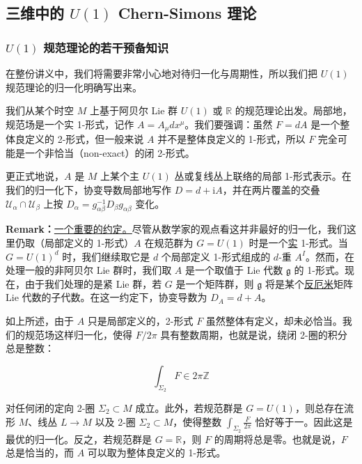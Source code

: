 \subsection{三维中的 $U(1)$ Chern-Simons 理论} %

\subsubsection{$U(1)$ 规范理论的若干预备知识} %

在整份讲义中，我们将需要非常小心地对待归一化与周期性，所以我们把 $U(1)$ 规范理论的归一化明确写出来。

我们从某个时空 $M$ 上基于阿贝尔 Lie 群 $U(1)$ 或 $\mathbb{R}$ 的规范理论出发。局部地，规范场是一个实 1-形式，记作 $A=A_\mu dx^\mu$。我们要强调：虽然 $F=dA$ 是一个整体良定义的 2-形式，但一般来说 $A$ 并不是整体良定义的 1-形式，所以 $F$ 完全可能是一个非恰当（non-exact）的闭 2-形式。

更正式地说，$A$ 是 $M$ 上某个主 $U(1)$ 丛或复线丛上联络的局部 1-形式表示。在我们的归一化下，协变导数局部地写作 $D=d+\mathrm{i}A$，并在两片覆盖的交叠 $\mathcal{U}_\alpha\cap\mathcal{U}_\beta$ 上按 $D_\alpha=g_{\alpha\beta}^{-1}D_\beta g_{\alpha\beta}$ 变化。

\textbf{Remark：}\underline{一个重要的约定。}尽管从数学家的观点看这并非最好的归一化，我们这里仍取（局部定义的 1-形式）$A$ 在规范群为 $G=U(1)$ 时是一个\underline{实} 1-形式。当 $G=U(1)^{d}$ 时，我们继续取它是 $d$ 个局部定义 1-形式组成的 $d$-重 $A^{I}$。然而，在处理一般的非阿贝尔 Lie 群时，我们取 $A$ 是一个取值于 Lie 代数 $\mathfrak{g}$ 的 1-形式。现在，由于我们处理的是紧 Lie 群，若 $G$ 是一个矩阵群，则 $\mathfrak{g}$ 将是某个\underline{反厄米}矩阵 Lie 代数的子代数。在这一约定下，协变导数为 $D_A=d+A$。

如上所述，由于 $A$ 只是局部定义的，2-形式 $F$ 虽然整体有定义，却未必恰当。我们的规范场这样归一化，使得 $F/2\pi$ 具有整数周期，也就是说，绕闭 2-圈的积分总是整数：

\begin{equation}
  \int_{\Sigma_2}F\in 2\pi\mathbb{Z}
  \tag{2.38}
  \label{eq:2.38}
\end{equation}

对任何闭的定向 2-圈 $\Sigma_2\subset M$ 成立。此外，若规范群是 $G=U(1)$，则总存在流形 $M$、线丛 $L\to M$ 以及 2-圈 $\Sigma_2\subset M$，使得整数 $\int_{\Sigma_2}\frac{F}{2\pi}$ 恰好等于一。因此这是最优的归一化。反之，若规范群是 $G=\mathbb{R}$，则 $F$ 的周期将总是零。也就是说，$F$ 总是恰当的，而 $A$ 可以取为整体良定义的 1-形式。

